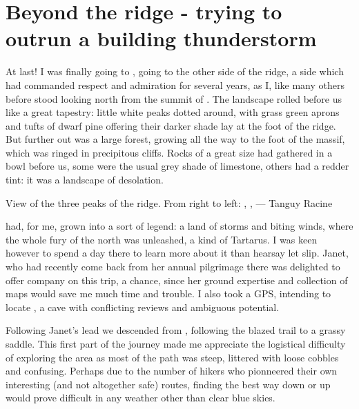 \section{Beyond the ridge - trying to outrun a building thunderstorm}
At last! I was finally going to , going to the other side of the ridge, a side which had commanded respect and admiration for several years, as I, like many others before stood looking north from the summit of . The landscape rolled before us like a great  tapestry: little white peaks dotted around, with grass green aprons and tufts of dwarf pine offering their darker shade lay at the foot of the ridge. But further out was a large forest, growing all the way to the foot of the  massif, which was ringed in precipitous cliffs. Rocks of a great size had gathered in a bowl before us, some were the usual grey shade of limestone, others had a redder tint: it was a landscape of desolation.

\begin{marginfigure}
    \checkoddpage \ifoddpage \forcerectofloat \else \forceversofloat \fi
    \centering
    \label{AreaNrob}
    \caption{View of the three peaks of the ridge. From right to left: \protect{}, \protect{}, \protect{} --- Tanguy Racine}
\end{marginfigure}

 had, for me, grown into a sort of legend: a land of storms and biting winds, where the whole fury of the north was unleashed, a kind of Tartarus. I was keen however to spend a day there to learn more about it than hearsay let slip. Janet, who had recently come back from her annual pilgrimage there was delighted to offer company on this trip, a chance, since her ground expertise and collection of maps would save me much time and trouble. I also took a GPS, intending to locate , a cave with conflicting reviews and ambiguous potential. 

Following Janet's lead we descended from , following the blazed trail to a grassy saddle. This first part of the journey made me appreciate the logistical difficulty of exploring the area as most of the path was steep, littered with loose cobbles and confusing. Perhaps due to the number of  hikers who pionneered their own interesting (and not altogether safe) routes, finding the best way down or up would prove difficult in any weather other than clear blue skies. 


